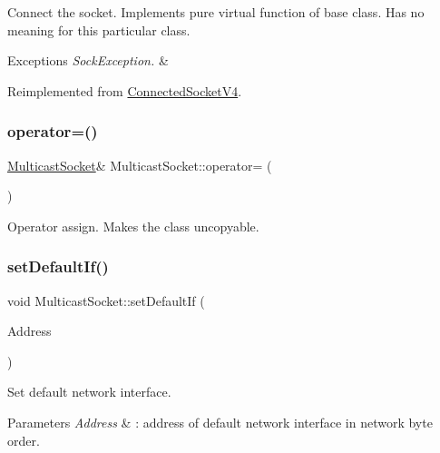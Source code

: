 Connect the socket. Implements pure virtual function of base class. Has no meaning for this particular class. 
\begin{DoxyExceptions}{Exceptions}
{\em Sock\+Exception.} & \\
\hline
\end{DoxyExceptions}


Reimplemented from \hyperlink{classConnectedSocketV4_a034d0c949fa1a0f14c136f839915d1a4}{Connected\+Socket\+V4}.

\mbox{\label{classMulticastSocket_a644a16ae716496f9d92389f7a9e80b3e}} 
\subsubsection{\texorpdfstring{operator=()}{operator=()}}
{\footnotesize\ttfamily \hyperlink{classMulticastSocket}{Multicast\+Socket}\& Multicast\+Socket\+::operator= (\begin{DoxyParamCaption}\item[{\hyperlink{classMulticastSocket}{Multicast\+Socket} \&}]{ }\end{DoxyParamCaption})\hspace{0.3cm}{\ttfamily [private]}}

Operator assign. Makes the class uncopyable. \mbox{\label{classMulticastSocket_a64399ca9f96c7f8fcf453c6233d17165}} 
\subsubsection{\texorpdfstring{set\+Default\+If()}{setDefaultIf()}\hspace{0.1cm}{\footnotesize\ttfamily [1/2]}}
{\footnotesize\ttfamily void Multicast\+Socket\+::set\+Default\+If (\begin{DoxyParamCaption}\item[{in\+\_\+addr\+\_\+t}]{Address }\end{DoxyParamCaption})}

Set default network interface. 
\begin{DoxyParams}{Parameters}
{\em Address} & \+: address of default network interface in network byte order. \\
\hline
\end{DoxyParams}

